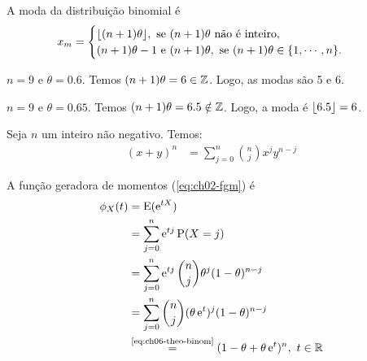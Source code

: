 A moda da distribuição binomial é
\begin{align*}
    x_m &= \begin{cases}
        \floor{(n+1)\theta},\ 
        \text{se $(n+1)\theta$ não é inteiro}, \\
        (n+1)\theta-1\text{ e }(n+1)\theta,\ 
        \text{se }(n+1)\theta \in \{1,\cdots,n\}.
    \end{cases}
\end{align*}

\begin{example}
    $n = 9$ e $\theta = 0.6$.
    Temos $(n+1)\theta = 6 \in \operatorname{\mathbb{Z}}$.
    Logo, as modas são 5 e 6.
\end{example}

\begin{example}
    $n = 9$ e $\theta = 0.65$.
    Temos $(n+1)\theta = 6.5 \notin \operatorname{\mathbb{Z}}$.
    Logo, a moda é $\lfloor6.5\rfloor =6$.
\end{example}

\begin{theorem}
    Seja $n$ um inteiro não negativo. Temos:
    \begin{align}
        (x + y)^n &= \sum_{j=0}^n \binom{n}{j} x^j y^{n-j}
        \label{eq:ch06-theo-binom}
    \end{align}
\end{theorem}

A função geradora de momentos (\cref{eq:ch02-fgm}) é
\begin{align*}
    \phi_X(t) &= \Expected(\e^{tX}) \\
    &= \sum_{j=0}^n \e^{tj} \Prob(X=j) \\
    &= \sum_{j=0}^n \e^{tj} \binom{n}{j} \theta^j (1-\theta)^{n-j} \\
    &= \sum_{j=0}^n \binom{n}{j} (\theta \e^{t})^j (1-\theta)^{n-j} \\
    &\overset{\text{\cref{eq:ch06-theo-binom}}}{=}
        (1-\theta+\theta \e^{t})^n,\ t\in\R
\end{align*}
